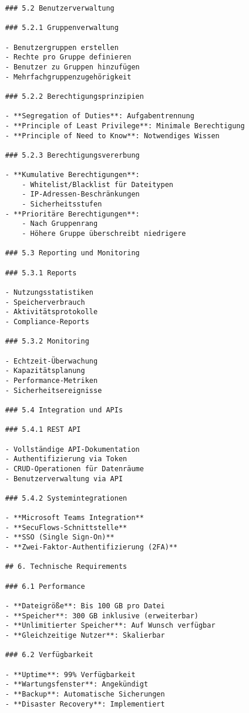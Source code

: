 \begin{verbatim}
    ### 5.2 Benutzerverwaltung
    
    ### 5.2.1 Gruppenverwaltung
    
    - Benutzergruppen erstellen
    - Rechte pro Gruppe definieren
    - Benutzer zu Gruppen hinzufügen
    - Mehrfachgruppenzugehörigkeit
    
    ### 5.2.2 Berechtigungsprinzipien
    
    - **Segregation of Duties**: Aufgabentrennung
    - **Principle of Least Privilege**: Minimale Berechtigung
    - **Principle of Need to Know**: Notwendiges Wissen
    
    ### 5.2.3 Berechtigungsvererbung
    
    - **Kumulative Berechtigungen**:
        - Whitelist/Blacklist für Dateitypen
        - IP-Adressen-Beschränkungen
        - Sicherheitsstufen
    - **Prioritäre Berechtigungen**:
        - Nach Gruppenrang
        - Höhere Gruppe überschreibt niedrigere
    
    ### 5.3 Reporting und Monitoring
    
    ### 5.3.1 Reports
    
    - Nutzungsstatistiken
    - Speicherverbrauch
    - Aktivitätsprotokolle
    - Compliance-Reports
    
    ### 5.3.2 Monitoring
    
    - Echtzeit-Überwachung
    - Kapazitätsplanung
    - Performance-Metriken
    - Sicherheitsereignisse
    
    ### 5.4 Integration und APIs
    
    ### 5.4.1 REST API
    
    - Vollständige API-Dokumentation
    - Authentifizierung via Token
    - CRUD-Operationen für Datenräume
    - Benutzerverwaltung via API
    
    ### 5.4.2 Systemintegrationen
    
    - **Microsoft Teams Integration**
    - **SecuFlows-Schnittstelle**
    - **SSO (Single Sign-On)**
    - **Zwei-Faktor-Authentifizierung (2FA)**
    
    ## 6. Technische Requirements
    
    ### 6.1 Performance
    
    - **Dateigröße**: Bis 100 GB pro Datei
    - **Speicher**: 300 GB inklusive (erweiterbar)
    - **Unlimitierter Speicher**: Auf Wunsch verfügbar
    - **Gleichzeitige Nutzer**: Skalierbar
    
    ### 6.2 Verfügbarkeit
    
    - **Uptime**: 99% Verfügbarkeit
    - **Wartungsfenster**: Angekündigt
    - **Backup**: Automatische Sicherungen
    - **Disaster Recovery**: Implementiert
    

\end{verbatim}
